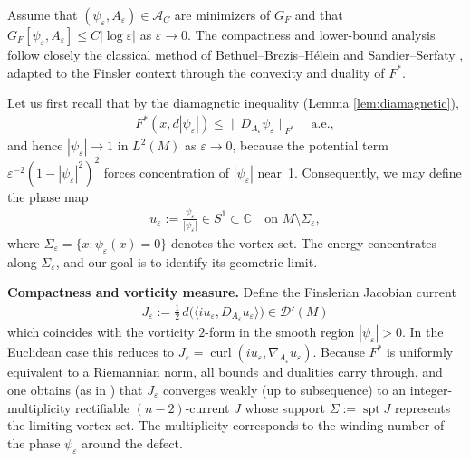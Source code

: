 \documentclass[fleqn,11pt,twoside]{article}
\theoremstyle{definition}
\begin{document}
Assume that $(\psi_\varepsilon, A_\varepsilon)\in\mathcal{A}_C$ are minimizers of $G_F$ and that $G_F[\psi_\varepsilon, A_\varepsilon] \le C|\log\varepsilon|$ as $\varepsilon\to 0$. The compactness and lower-bound analysis follow closely the classical method of Bethuel--Brezis--H\'elein \cite{BBH1994}
 and Sandier--Serfaty \cite{SandierSerfaty2007,SandierSerfaty2011}, adapted to the Finsler context through the convexity and duality of $F^*$.

Let us first recall that by the diamagnetic inequality
(Lemma \ref{lem:diamagnetic}),
\begin{align*}
F^*(x,d|\psi_\varepsilon|)\le \|D_{A_\varepsilon}\psi_\varepsilon\|_{F^*} \quad\text{a.e.},
\end{align*}
and hence $|\psi_\varepsilon|\to 1$ in $L^2(M)$ as $\varepsilon\to 0$, because the potential term
$\varepsilon^{-2}(1-|\psi_\varepsilon|^2)^2$
forces concentration of $|\psi_\varepsilon|$ near~1.
Consequently, we may define the phase map
\begin{align*}
u_\varepsilon := \frac{\psi_\varepsilon}{|\psi_\varepsilon|}
\in S^1 \subset \mathbb{C} \quad\text{on } M\setminus\Sigma_\varepsilon,
\end{align*}
where $\Sigma_\varepsilon = \{x: \psi_\varepsilon(x)=0\}$ denotes
the vortex set. The energy concentrates along $\Sigma_\varepsilon$,
and our goal is to identify its geometric limit.

\medskip
\noindent\textbf{Compactness and vorticity measure.}
Define the Finslerian Jacobian current
\begin{align*}
J_\varepsilon := \frac{1}{2}\, d \big( \langle i u_\varepsilon, D_{A_\varepsilon} u_\varepsilon \rangle \big)\in \mathcal{D}'(M)
\end{align*}
which coincides with the vorticity $2$-form in the smooth region
$|\psi_\varepsilon|>0$. In the Euclidean case this reduces to
$J_\varepsilon = \operatorname{curl}(iu_\varepsilon, \nabla_{A_\varepsilon}u_\varepsilon)$.
Because $F^*$ is uniformly equivalent to a Riemannian norm, all
bounds and dualities carry through, and one obtains (as in
\cite{BBH1994, SandierSerfaty2007}) that $J_\varepsilon$ converges weakly (up to subsequence) to an integer-multiplicity rectifiable $(n-2)$-current $J$ whose support $\Sigma:=\operatorname{spt}J$ represents the limiting vortex set. The multiplicity corresponds to the winding number of the phase $\psi_\varepsilon$ around the defect.
\end{document}
